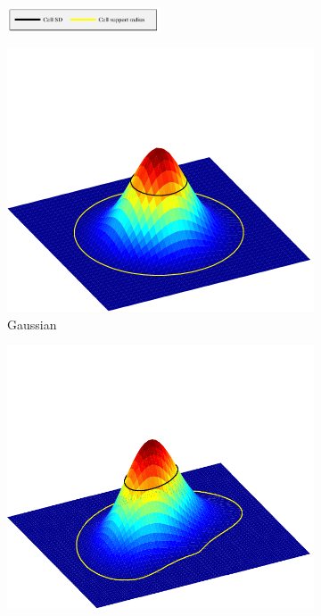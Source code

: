 \documentclass[thesis.tex]{subfiles}
\begin{document}
\begin{figure}[p]
	\centering
	\begin{subfigure}[t]{\textwidth}
		\centering
		\includegraphics[width=0.5\textwidth]{img/cellWindow_legend.pdf}
	\end{subfigure}
	\begin{subfigure}[t]{0.40\textwidth}
		\includegraphics[width=\textwidth, clip=true, trim=0 0 0 90]{img/cellWindow.pdf}
		\caption{Gaussian}
		\label{fig:cellWindow}
	\end{subfigure}
	\begin{subfigure}[t]{0.40\textwidth}
		\includegraphics[width=\textwidth, clip=true, trim=0 0 0 90]{img/cellWindowPolar.pdf}

\end{subfigure}
\end{figure}
\end{document}
